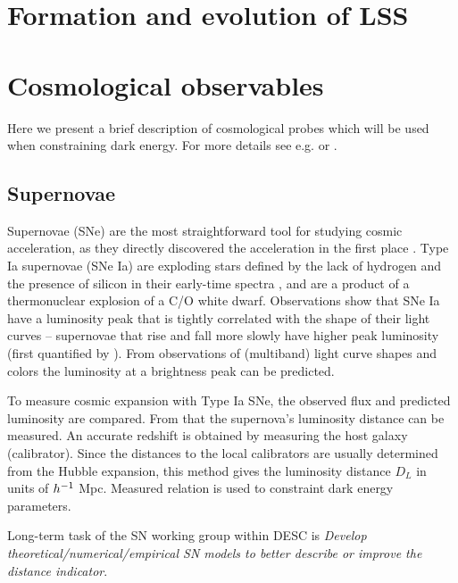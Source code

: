 \section{Formation and evolution of LSS}

\section{Cosmological observables}
Here we present a brief description of cosmological probes which will be used when constraining dark energy. For more details see e.g. \cite{DE_probes} or \cite{DE_probes2}.
\subsection{Supernovae}
Supernovae (SNe) are the most straightforward tool for studying cosmic acceleration, as they directly discovered the acceleration in the first place \cite{riess}. Type Ia supernovae (SNe Ia) are exploding stars defined by the lack of hydrogen and the presence of silicon in their early-time spectra \cite{SN}, and are a product of a thermonuclear explosion of a C/O white dwarf. Observations show that SNe Ia have a luminosity peak that is tightly correlated with the shape of their light curves -- supernovae that rise and fall more slowly have higher peak luminosity (first quantified by \cite{SN_lum}). From observations of (multiband) light curve shapes and colors the luminosity at a brightness peak can be predicted.

To measure cosmic expansion with Type Ia SNe, the observed flux and predicted luminosity are compared. From that the supernova's luminosity distance can be measured. An accurate redshift is obtained by measuring the host galaxy (calibrator). Since the distances to the local calibrators are usually determined from the Hubble expansion, this method gives the luminosity distance $D_L$ in units of $h^{-1}$ Mpc. Measured relation is used to constraint dark energy parameters.

Long-term task of the SN working group within DESC is \textit{Develop theoretical/numerical/empirical SN models to better describe or
improve the distance indicator}.
